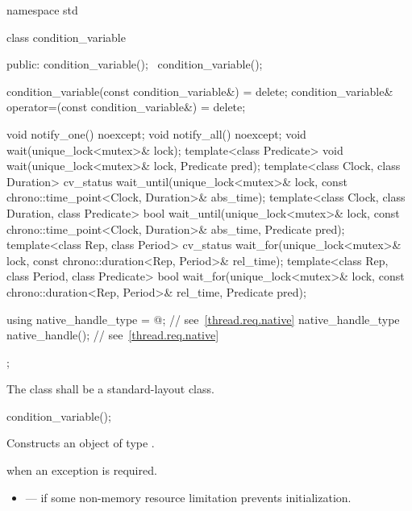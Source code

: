 %
\begin{codeblock}
namespace std {
  class condition_variable {
  public:
    condition_variable();
    ~condition_variable();

    condition_variable(const condition_variable&) = delete;
    condition_variable& operator=(const condition_variable&) = delete;

    void notify_one() noexcept;
    void notify_all() noexcept;
    void wait(unique_lock<mutex>& lock);
    template<class Predicate>
      void wait(unique_lock<mutex>& lock, Predicate pred);
    template<class Clock, class Duration>
      cv_status wait_until(unique_lock<mutex>& lock,
                           const chrono::time_point<Clock, Duration>& abs_time);
    template<class Clock, class Duration, class Predicate>
      bool wait_until(unique_lock<mutex>& lock,
                      const chrono::time_point<Clock, Duration>& abs_time,
                      Predicate pred);
    template<class Rep, class Period>
      cv_status wait_for(unique_lock<mutex>& lock,
                         const chrono::duration<Rep, Period>& rel_time);
    template<class Rep, class Period, class Predicate>
      bool wait_for(unique_lock<mutex>& lock,
                    const chrono::duration<Rep, Period>& rel_time,
                    Predicate pred);

    using native_handle_type = @\impdefnc@;          // see~\ref{thread.req.native}
    native_handle_type native_handle();                         // see~\ref{thread.req.native}
  };
}
\end{codeblock}

\pnum
The class  shall be a standard-layout class.

%
\begin{itemdecl}
condition_variable();
\end{itemdecl}

\begin{itemdescr}
\pnum
\effects
Constructs an object of type .

\pnum
\throws
{} when an exception is required.

\pnum
\errors
\begin{itemize}
\item {} --- if some non-memory resource
limitation prevents initialization.
\end{itemize}
\end{itemdescr}

